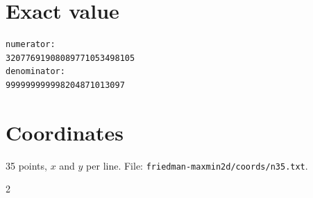 \documentclass[11pt,a4paper]{article}
\begin{document}
\appendix
\section{Exact value}
{\small
\begin{verbatim}
numerator:
32077691908089771053498105
denominator:
999999999998204871013097
\end{verbatim}}

\section{Coordinates}
35 points, $x$ and $y$ per line. File: \texttt{friedman-maxmin2d/coords/n35.txt}.
{\tiny
\begin{multicols}{2}
\end{multicols}}
\end{document}
